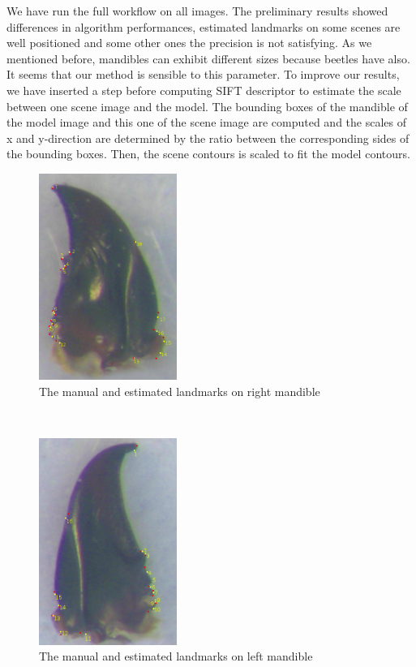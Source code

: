 \documentclass[twoside,twocolumn,10pt]{article}
\begin{document}
We have run the full workflow on all images. The preliminary results showed differences in algorithm performances, estimated landmarks on some scenes are well positioned and some other ones the precision is not satisfying. As we mentioned before, mandibles can exhibit different sizes because beetles have also. It seems that our method is sensible to this parameter. To improve our results, we have inserted a step before computing SIFT descriptor to estimate the scale between one scene image and the model. The bounding boxes of the mandible of the model image and this one of the scene image are computed and the scales of x and y-direction are determined by the ratio between the corresponding sides of the bounding boxes. Then, the scene contours is scaled to fit the model contours. 
\begin{figure}[h]
\centering
\includegraphics[width=0.4\textwidth]{./images/md_rs}
\caption{The manual and estimated landmarks on right mandible}
\label{figresult}
\end{figure}~\\
\begin{figure}[h]
\centering
\includegraphics[width=0.4\textwidth]{./images/mg_rs}
\caption{The manual and estimated landmarks on left mandible}
\label{figresult2}
\end{figure}~\\
\end{document}
